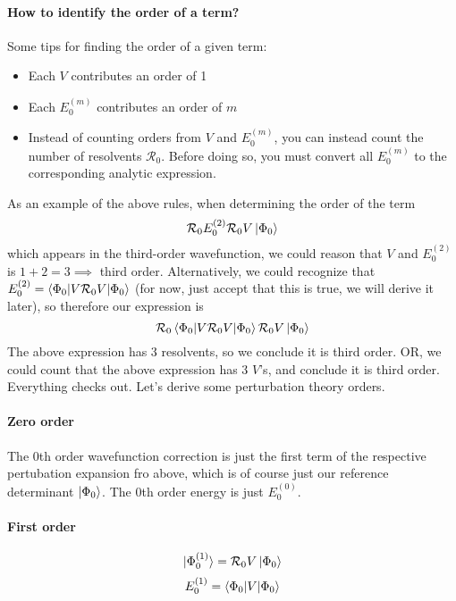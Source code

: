 \documentclass{article}
\newcommand{\Ezero}{E^{(0)}}
\newcommand{\Rz}{\mathcal{R}_{0}}
\begin{document}
\paragraph{\textbf{How to identify the order of a term?}}
Some tips for finding the order of a given term:
\begin{itemize} 
\item Each $V$ contributes an order of 1
\item Each $E_0^{(m)}$ contributes an order of $m$
\item Instead of counting orders from $V$ and $E_0^{(m)}$, you can instead count
the number of resolvents $\Rz$. Before doing so, you must convert all $E_0^{(m)}$ to the 
corresponding analytic expression.
\end{itemize}
As an example of the above rules, when determining the order of the term 
\[ \Rz E_0^{(2)} \Rz V \ket{\Phi_0} \]
which appears in the third-order wavefunction, 
we could reason that $V$ and $E_0^{(2)}$ is $1 + 2 = 3 \implies$ third order.
Alternatively, we could recognize that $E_0^{(2)} = \braket{\Phi_0 |V \Rz V|\Phi_0}$ (for now,
just accept that this is true, we will derive it later),
so therefore our expression is 
\[ \Rz \braket{\Phi_0 |V \Rz V|\Phi_0} \Rz V \ket{\Phi_0} \]
The above expression has 3 resolvents, so we conclude it is third order.
OR, we could count that the above expression has 3 $V$'s, and conclude it is third order.
Everything checks out.
Let's derive some perturbation theory orders.

\paragraph{\textbf{Zero order}}
The 0th order wavefunction correction is just the first term of the respective pertubation expansion
fro above, which is of course just our reference determinant $\ket{\Phi_0}$. 
The 0th order energy is just $\Ezero_0$.

\paragraph{\textbf{First order}}
\[ \ket{\Phi_0^{(1)}} = \Rz V \ket{\Phi_0}\]
\[ E_0^{(1)} = \braket{ \Phi_0 | V | \Phi_0} \]
\end{document}
